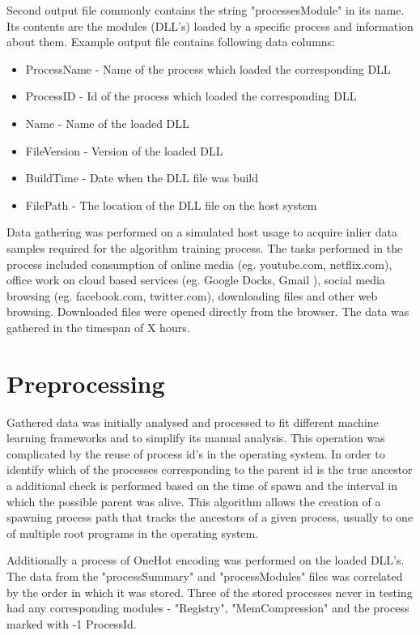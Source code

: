 \documentclass[a4paper,twoside,12pt]{book}
\begin{document}
Second output file commonly contains the string "processesModule" in its name. Its contents
are the modules (DLL's) loaded by a specific process and information about them. Example 
output file contains following data columns:
\begin{itemize}
	\item ProcessName - Name of the process which loaded the corresponding DLL
	\item ProcessID - Id of the process which loaded the corresponding DLL
	\item Name - Name of the loaded DLL
	\item FileVersion - Version of the loaded DLL
	\item BuildTime - Date when the DLL file was build
	\item FilePath - The location of the DLL file on the host system
\end{itemize}

Data gathering was performed on a simulated host usage to acquire inlier data samples required 
for the algorithm training process. The tasks performed in the process 
included consumption of online media (eg. youtube.com, netflix.com), office work on cloud 
based services (eg. Google Docks, Gmail ), social media browsing (eg. facebook.com, 
twitter.com), downloading files and other web browsing. Downloaded files were opened 
directly from the browser. The data was gathered in the timespan of X hours. %

\section{Preprocessing}

Gathered data was initially analysed and processed to fit different machine learning 
frameworks and to simplify its manual analysis. This operation was complicated by the 
reuse of process id's in the operating system. In order to identify which of the processes 
corresponding to the parent id is the true ancestor a additional check is performed based 
on the time of spawn and the interval in which the possible parent was alive. This algorithm 
allows the creation of a spawning process path that tracks the ancestors of a given process, 
usually to one of multiple root programs in the operating system. 

Additionally a process of OneHot encoding was performed on the loaded DLL's. The data from 
the "processSummary" and "processModules" files was correlated by the order in which it was 
stored. Three of the stored processes never in testing had any corresponding modules - 
"Registry", "MemCompression" and the process marked with -1 ProcessId.
\end{document}
